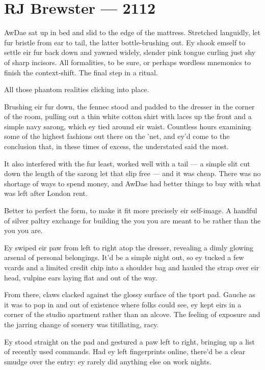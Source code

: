 \hypertarget{rj-brewster-2112}{%
\chapter*{RJ Brewster — 2112}\label{rj-brewster-2112}}

AwDae sat up in bed and slid to the edge of the mattress. Stretched languidly, let fur bristle from ear to tail, the latter bottle-brushing out. Ey shook emself to settle eir fur back down and yawned widely, slender pink tongue curling just shy of sharp incisors. All formalities, to be sure, or perhaps wordless mnemonics to finish the context-shift. The final step in a ritual.

All those phantom realities clicking into place.

Brushing eir fur down, the fennec stood and padded to the dresser in the corner of the room, pulling out a thin white cotton shirt with laces up the front and a simple navy sarong, which ey tied around eir waist. Countless hours examining some of the highest fashions out there on the 'net, and ey'd come to the conclusion that, in these times of excess, the understated said the most.

It also interfered with the fur least, worked well with a tail — a simple slit cut down the length of the sarong let that slip free — and it was cheap. There was no shortage of ways to spend money, and AwDae had better things to buy with what was left after London rent.

Better to perfect the form, to make it fit more precisely eir self-image. A handful of silver paltry exchange for building the you you are meant to be rather than the you you are.

Ey swiped eir paw from left to right atop the dresser, revealing a dimly glowing arsenal of personal belongings. It'd be a simple night out, so ey tucked a few vcards and a limited credit chip into a shoulder bag and hauled the strap over eir head, vulpine ears laying flat and out of the way.

From there, claws clacked against the glossy surface of the tport pad. Gauche as it was to pop in and out of existence where folks could see, ey kept eirs in a corner of the studio apartment rather than an alcove. The feeling of exposure and the jarring change of scenery was titillating, racy.

Ey stood straight on the pad and gestured a paw left to right, bringing up a list of recently used commands. Had ey left fingerprints online, there'd be a clear smudge over the entry: ey rarely did anything else on work nights.


